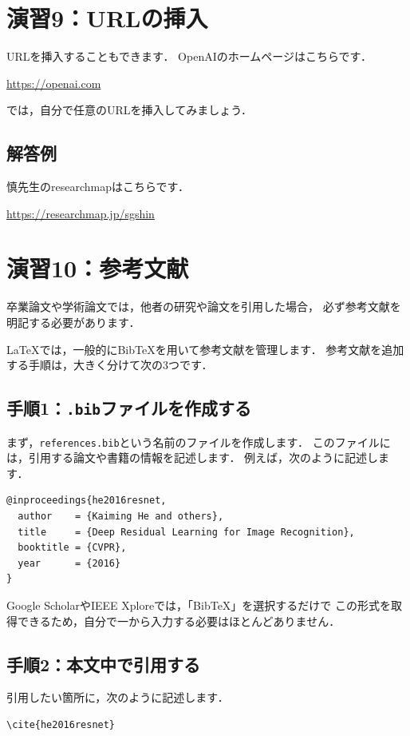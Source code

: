\documentclass[a4paper,twocolumn]{jsarticle}
\begin{document}
\section*{演習9：URLの挿入}
URLを挿入することもできます．
OpenAIのホームページはこちらです．

\url{https://openai.com}

では，自分で任意のURLを挿入してみましょう．

\subsection*{解答例}
慎先生のresearchmapはこちらです．

\url{https://researchmap.jp/sgshin}

\section*{演習10：参考文献}
卒業論文や学術論文では，他者の研究や論文を引用した場合，
必ず参考文献を明記する必要があります．

LaTeXでは，一般的にBibTeXを用いて参考文献を管理します．
参考文献を追加する手順は，大きく分けて次の3つです．

\subsection*{手順1：\texttt{.bib}ファイルを作成する}
まず，\texttt{references.bib}という名前のファイルを作成します．
このファイルには，引用する論文や書籍の情報を記述します．
例えば，次のように記述します．

\begin{lstlisting}[language={}]
@inproceedings{he2016resnet,
  author    = {Kaiming He and others},
  title     = {Deep Residual Learning for Image Recognition},
  booktitle = {CVPR},
  year      = {2016}
}
\end{lstlisting}

Google ScholarやIEEE Xploreでは，「BibTeX」を選択するだけで
この形式を取得できるため，自分で一から入力する必要はほとんどありません．

\subsection*{手順2：本文中で引用する}
引用したい箇所に，次のように記述します．

\begin{verbatim}
\cite{he2016resnet}
\end{verbatim}
\end{document}
